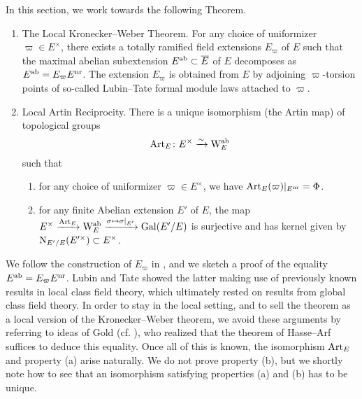 \documentclass[../main.tex]{subfiles}
\begin{document}
In this section, we work towards the following Theorem.

\begin{thm}\label{thm:LocalKroneckerWeber} \leavevmode
  \vspace{-0.5em}
  \begin{enumerate}
    \item \textnormal{The Local Kronecker--Weber Theorem.} For any choice of uniformizer $\varpi \in E^\times$, there exists a 
      totally ramified field extensions $E_\varpi$ of $E$ such that 
      the maximal abelian subextension $E^{\mathrm{ab}} \subset \overline E$ of $E$
      decomposes as $E^{\mathrm{ab}} = E_\varpi E^{\mathrm{nr}}$. The extension 
      $E_\varpi$ is obtained from $E$ by adjoining $\varpi$-torsion points of so-called
      Lubin--Tate formal module laws attached to $\varpi$. 
    \item \textnormal{Local Artin Reciprocity.} There is a unique isomorphism
      (the Artin map) of topological groups
      \begin{equation*}
        \mathrm{Art}_E\colon E^\times \xrightarrow{\sim} \mathrm W_E^{\mathrm{ab}}
      \end{equation*}
      such that 
      \begin{enumerate}
        \item for any choice of uniformizer $\varpi \in E^\times$, we have
          $\mathrm{Art}_E(\varpi)|_{E^{\mathrm{nr}}} = \Phi$.
        \item for any finite Abelian extension $E'$ of $E$, the
          map $E^\times \xrightarrow{\mathrm{Art}_E} \mathrm W_E^{\mathrm{ab}} \xrightarrow{\sigma \mapsto
          \sigma|_{E'}} \operatorname{Gal}(E'/E)$ is surjective and has kernel given by
          $\mathrm{N}_{E'/E}(E'^\times) \subset E^\times$. 
      \end{enumerate}
  \end{enumerate}
\end{thm}

We follow the construction of $E_\varpi$ in \cite{LubinTateFormalMult}, and we sketch
a proof of the equality $E^{\mathrm{ab}} = E_\varpi E^{\mathrm{nr}}$. Lubin and Tate showed the latter
making use of previously known results in local class field theory, which ultimately
rested on results from global class field theory. 
In order to stay in the local setting, and to sell the theorem as a
local version of the Kronecker--Weber theorem,
we avoid these arguments by referring to ideas of Gold (cf.
\cite{gold1981local}), who realized that the theorem of Hasse--Arf
suffices to deduce this equality. 
Once all of this is known, the isomorphism $\mathrm{Art}_E$ and property
(a) arise naturally. We do not prove property (b), but we shortly note how to see
that an isomorphism satisfying properties (a) and (b) has to be unique.
\end{document}
